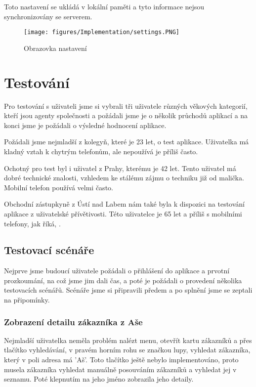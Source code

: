 \documentclass[11pt,twoside,a4paper]{book}
\begin{document}
Toto nastavení se ukládá v lokální paměti a tyto informace nejsou synchronizovány se serverem.

\begin{figure}[H]
\begin{center}
\texttt{[image: figures/Implementation/settings.PNG]}
\caption{Obrazovka nastavení}
\label{fig:customerdetailscreens}
\end{center}
\end{figure}

\chapter{Testování}
Pro testování s uživateli jsme si vybrali tři uživatele různých věkových kategorií, kteří jsou agenty společnosti a požádali jsme je o několik průchodů aplikací a na konci jsme je požádali o výsledné hodnocení aplikace.

Požádali jsme nejmladší z kolegyň, které je 23 let, o test aplikace. Uživatelka má kladný vztah k chytrým telefonům, ale nepoužívá je příliš často.

Ochotný pro test byl i uživatel z Prahy, kterému je 42 let. Tento uživatel má dobré technické znalosti, vzhledem ke stálému zájmu o techniku již od malička. Mobilní telefon používá velmi často.

Obchodní zástupkyně z Ústí nad Labem nám také byla k dispozici na testování aplikace z uživatelské přívětivosti. Této uživatelce je 65 let a příliš s mobilními telefony, jak říká, .

\section{Testovací scénáře}
Nejprve jsme budoucí uživatele požádali o přihlášení do aplikace a prvotní prozkoumání, na což jsme jim dali čas, a poté je požádali o provedení několika testovacích scénářů. Scénáře jsme si připravili předem a po splnění jsme se zeptali na připomínky. 

\subsection{Zobrazení detailu zákazníka z Aše}
Nejmladší uživatelka neměla problém nalézt menu, otevřít kartu zákazníků a přes tlačítko vyhledávání, v pravém horním rohu se značkou lupy, vyhledat zákazníka, který v poli adresa má 'Aš'. Toto tlačítko ještě nebylo implementováno, proto musela zákazníka vyhledat manuálně posouváním zákazníků a vyhledat jej v seznamu. Poté klepnutím na jeho jméno zobrazila jeho detaily. 
\end{document}
